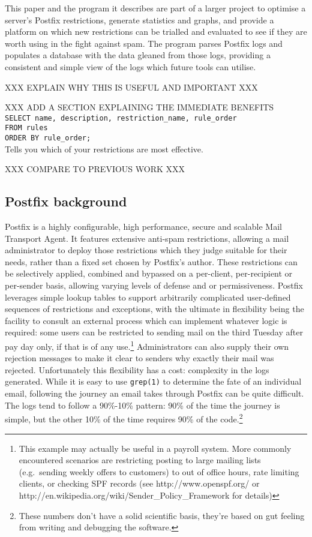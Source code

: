 \documentclass[a4paper,12pt,draft]{article}
\begin{document}
This paper and the program it describes are part of a larger project to
optimise a server's Postfix restrictions, generate statistics and graphs,
and provide a platform on which new restrictions can be trialled and
evaluated to see if they are worth using in the fight against spam.  The
program parses Postfix logs and populates a database with the data gleaned
from those logs, providing a consistent and simple view of the logs which
future tools can utilise.  

XXX EXPLAIN WHY THIS IS USEFUL AND IMPORTANT XXX

XXX ADD A SECTION EXPLAINING THE IMMEDIATE BENEFITS \\
\texttt{SELECT name, description, restriction\_name, rule\_order \\
    FROM rules \\
    ORDER BY rule\_order;}\\
Tells you which of your restrictions are most effective.

XXX COMPARE TO PREVIOUS WORK XXX


\subsection{Postfix background}

Postfix is a highly configurable, high performance, secure and scalable
Mail Transport Agent.  It features extensive anti-spam restrictions,
allowing a mail administrator to deploy those restrictions which they judge
suitable for their needs, rather than a fixed set chosen by Postfix's
author.  These restrictions can be selectively applied, combined and
bypassed on a per-client, per-recipient or per-sender basis, allowing
varying levels of defense and or permissiveness.  Postfix leverages simple
lookup tables to support arbitrarily complicated user-defined sequences of
restrictions and exceptions, with the ultimate in flexibility being the
facility to consult an external process which can implement whatever logic
is required: some users can be restricted to sending mail on the third
Tuesday after pay day only, if that is of any use.\footnote{This example
may actually be useful in a payroll system.  More commonly encountered
scenarios are restricting posting to large mailing lists (e.g.\ sending
weekly offers to customers) to out of office hours, rate limiting clients,
or checking SPF records (see http://www.openspf.org/ or
http://en.wikipedia.org/wiki/Sender\_Policy\_Framework for details)}
Administrators can also supply their own rejection messages to make it
clear to senders why exactly their mail was rejected.  Unfortunately this
flexibility has a cost: complexity in the logs generated.  While it is easy
to use \texttt{grep(1)} to determine the fate of an individual email,
following the journey an email takes through Postfix can be quite
difficult.  The logs tend to follow a 90\%-10\% pattern: 90\% of the time
the journey is simple, but the other 10\% of the time requires 90\% of the
code.\footnote{These numbers don't have a solid scientific basis, they're
based on gut feeling from writing and debugging the software.}
\end{document}
